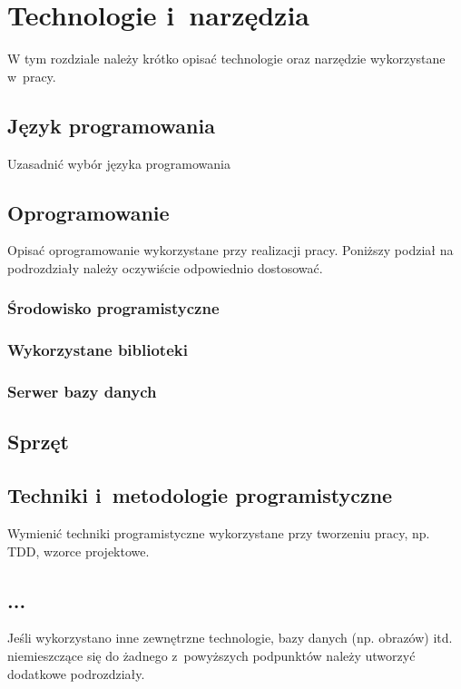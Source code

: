 \chapter{Technologie i~narzędzia}\label{chap:narzedzia}
W tym rozdziale należy krótko opisać technologie oraz narzędzie wykorzystane w~pracy. 

\section{Język programowania}
Uzasadnić wybór języka programowania

\section{Oprogramowanie}
Opisać oprogramowanie wykorzystane przy realizacji pracy. Poniższy podział na podrozdziały należy oczywiście odpowiednio dostosować.

\subsection{Środowisko programistyczne}

\subsection{Wykorzystane biblioteki}

\subsection{Serwer bazy danych}

\section{Sprzęt}

\section{Techniki i~metodologie programistyczne}
Wymienić techniki programistyczne wykorzystane przy tworzeniu pracy, np. TDD, wzorce projektowe.

\section{...}
Jeśli wykorzystano inne zewnętrzne technologie, bazy danych (np. obrazów) itd. niemieszczące się do żadnego z~powyższych podpunktów należy utworzyć dodatkowe podrozdziały.
